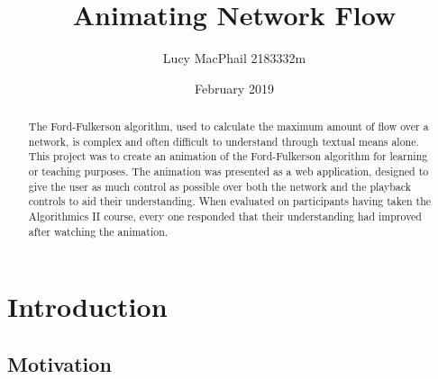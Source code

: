 \documentclass{l4proj}
\begin{document}
\title{Animating Network Flow}
\author{Lucy MacPhail 2183332m}
\date{February 2019}

\maketitle
\begin{abstract}
    The Ford-Fulkerson algorithm, used to calculate the maximum amount of flow over a network, is complex and often difficult to understand through textual means alone. This project was to create an animation of the Ford-Fulkerson algorithm for learning or teaching purposes. The animation was presented as a web application, designed to give the user as much control as possible over both the network and the playback controls to aid their understanding. When evaluated on participants having taken the Algorithmics II course, every one responded that their understanding had improved after watching the animation.
\end{abstract}


%
%
%
\educationalconsent


\tableofcontents
\chapter{Introduction}

\section{Motivation}
\begin{comment}
Why network flow is important to learn.

Why it was important to animate it.
\end{comment}
\end{document}
